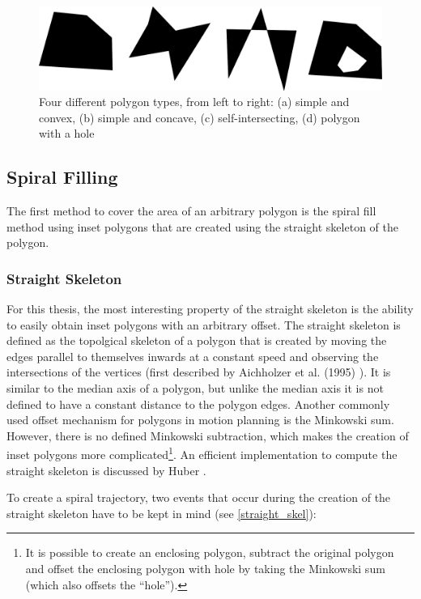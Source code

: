 \begin{figure}
\centering
\includegraphics[width=\textwidth]{images/path_planning/polygon_types.pdf}
\caption{Four different polygon types, from left to right: (a) simple and convex, (b) simple and concave, (c) self-intersecting, (d) polygon with a hole}
\label{straight_skel}
\end{figure}

\subsection{Spiral Filling}

The first method to cover the area of an arbitrary polygon is the spiral fill method using inset polygons that are created using the straight skeleton of the polygon.

\subsubsection{Straight Skeleton}

For this thesis, the most interesting property of the straight skeleton is the ability to easily obtain inset polygons with an arbitrary offset. The straight skeleton is defined as the topolgical skeleton of a polygon that is created by moving the edges parallel to themselves inwards at a constant speed and observing the intersections of the vertices (first described by Aichholzer et al. (1995) \cite{Aichholzer:jucs_1_12:a_novel_type_of}). 
It is similar to the median axis of a polygon, but unlike the median axis it is not defined to have a constant distance to the polygon edges. 
Another commonly used offset mechanism for polygons in motion planning is the Minkowski sum. However, there is no defined Minkowski subtraction, which makes the creation of inset polygons more complicated\footnote{It is possible to create an enclosing polygon, subtract the original polygon and offset the enclosing polygon with hole by taking the Minkowski sum (which also offsets the \enquote{hole}).}. An efficient implementation to compute the straight skeleton is discussed by Huber \cite{huber2010computing}.

To create a spiral trajectory, two events that occur during the creation of the straight skeleton have to be kept in mind (see \autoref{straight_skel}): 

